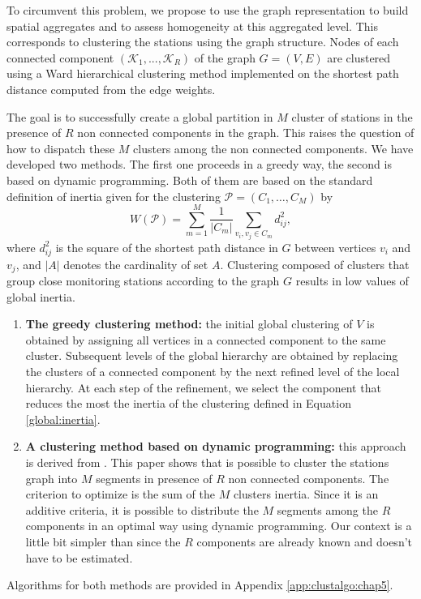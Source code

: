To circumvent this problem, we propose to use the graph representation to build spatial aggregates and to assess homogeneity at this aggregated level. This corresponds to clustering the stations using the graph structure. Nodes of each connected component $(\mathcal{K}_1,...,\mathcal{K}_R)$ of the graph $G=(V, E)$ are clustered using a Ward hierarchical clustering method implemented on the shortest path distance computed from the edge weights. 

The goal is to successfully create a global partition in $M$ cluster of stations in the presence of $R$ non connected components in the graph. This raises the question of how to dispatch these $M$ clusters among the non connected components. We have developed two methods. The first one proceeds in a greedy way, the second is based on dynamic programming. Both of them are based on the standard definition of inertia given for the clustering $\mathcal{P}=(C_1,\ldots, C_M)$ by
\begin{equation}\label{global:inertia}
    W(\mathcal{P}) = \sum_{m=1}^M \frac{1}{|C_m|}\sum_{v_i, v_j \in C_m}d^2_{ij},
\end{equation} 
where $d^2_{ij}$ is the square of the shortest path distance in $G$ between vertices $v_i$ and $v_j$, and $|A|$ denotes the cardinality of set $A$. Clustering composed of clusters that group close monitoring stations according to the graph $G$ results in low values of global inertia. 
\begin{enumerate}
    \item \textbf{The greedy clustering method:} the initial global clustering of $V$ is obtained by assigning all vertices in a connected component to the same cluster. Subsequent levels of the global hierarchy are obtained by replacing the clusters of a connected component by the next refined level of the local hierarchy. At each step of the refinement, we select the component that reduces the most the inertia of the clustering defined in Equation \ref{global:inertia}.
    \item \textbf{A clustering method based on dynamic programming:} this approach is derived from \cite{hebrail2010exploratory}. This paper shows that is possible to cluster the stations graph into $M$ segments in presence of $R$ non connected components. The criterion to optimize is the sum of the $M$ clusters inertia. Since it is an additive criteria, it is possible to distribute the $M$ segments among the $R$ components in an optimal way using dynamic programming. Our context is a little bit simpler than \cite{hebrail2010exploratory} since the $R$ components are already known and doesn't have to be estimated.  
\end{enumerate}
Algorithms for both methods are provided in Appendix \ref{app:clustalgo:chap5}. 

